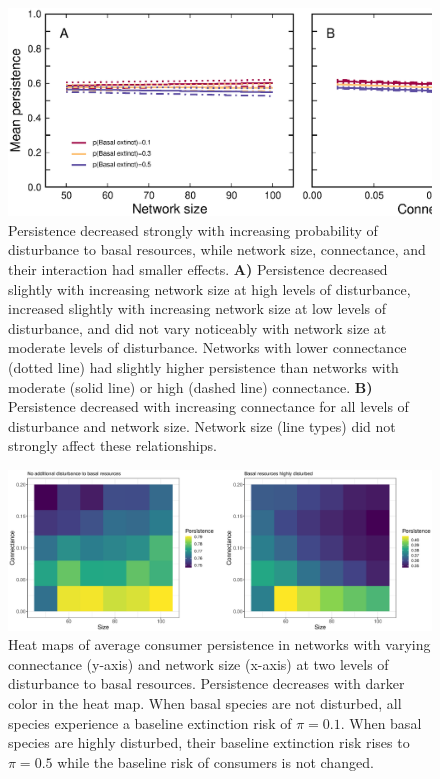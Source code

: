\documentclass[12pt]{article}
\begin{document}
\begin{spacing}{2.0}
    \begin{figure}[hb!]
        \centering
        \includegraphics[width=\textwidth]{figures/persistence_vs_SC_lm.eps}
        \caption{Persistence decreased strongly with increasing probability of disturbance to basal resources, while network size, connectance, and their interaction had smaller effects. \textbf{A)} Persistence decreased slightly with increasing network size at high levels of disturbance, increased slightly with increasing network size at low levels of disturbance, and did not vary noticeably with network size at moderate levels of disturbance. Networks with lower connectance (dotted line) had slightly higher persistence than networks with moderate (solid line) or high (dashed line) connectance.
        \textbf{B)} Persistence decreased with increasing connectance for all levels of disturbance and network size. Network size (line types) did not strongly affect these relationships.}
        \label{fig:lm_CS}
    \end{figure}



    \begin{figure}[hb!]
        \centering
      \includegraphics[width=\textwidth]{figures/heatmap_CS_BPcompare.eps}
       \caption{Heat maps of average consumer persistence in networks with varying connectance (y-axis) and network size (x-axis) at two levels of disturbance to basal resources. Persistence decreases with darker color in the heat map. When basal species are not disturbed, all species experience a baseline extinction risk of $\pi = 0.1$. When basal species are highly disturbed, their baseline extinction risk rises to $\pi = 0.5$ while the baseline risk of consumers is not changed.}
       \label{fig:heatmap_CS}
    \end{figure}



\end{spacing}
\end{document}
